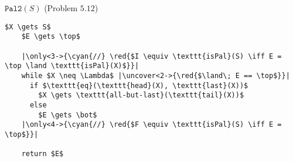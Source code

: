 
\begin{frame}[fragile]{}
  \begin{exampleblock}{$\texttt{Pal2}(S)$ (Problem $5.12$)}
    \begin{lstlisting}[style = CStyle]
    $X \gets S$
    $E \gets \top$

    |\only<3->{\cyan{//} \red{$I \equiv \texttt{isPal}(S) \iff E = \top \land \texttt{isPal}(X)$}}|
    while $X \neq \Lambda$ |\uncover<2->{\red{$\land\; E == \top$}}|
      if $\texttt{eq}(\texttt{head}(X), \texttt{last}(X))$
        $X \gets \texttt{all-but-last}(\texttt{tail}(X))$
      else
        $E \gets \bot$
    |\only<4->{\cyan{//} \red{$F \equiv \texttt{isPal}(S) \iff E = \top$}}|

    return $E$
    \end{lstlisting}
  \end{exampleblock}

\end{frame}
